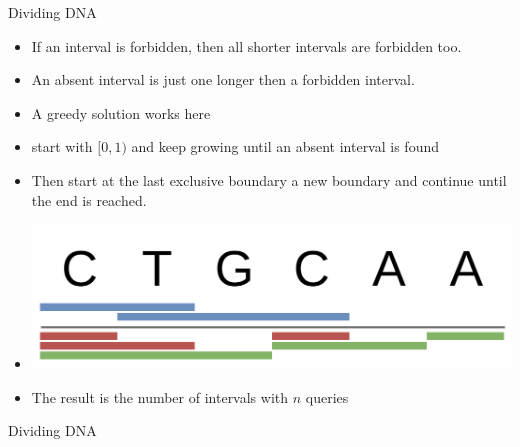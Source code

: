 \documentclass[11pt,pdf, aspectratio=169]{beamer}
\begin{document}
  \begin{frame}{Dividing DNA}
    \begin{itemize}
      \item If an interval is forbidden, then all shorter intervals are forbidden too.
      \item An absent interval is just one longer then a forbidden interval.
      \item A greedy solution works here
      \item start with $[0,1)$ and keep growing until an absent interval is found
      \item Then start at the last exclusive boundary a new boundary and continue until the end is reached.
      \item \includegraphics[width=.8\linewidth]{images/session-4/bapc-d}
      \item The result is the number of intervals with $n$ queries
    \end{itemize}

  \end{frame}
  \begin{frame}[containsverbatim]{Dividing DNA}
    \inputminted{python}{code/session-4/bapc-d.py}
  \end{frame}
\end{document}
